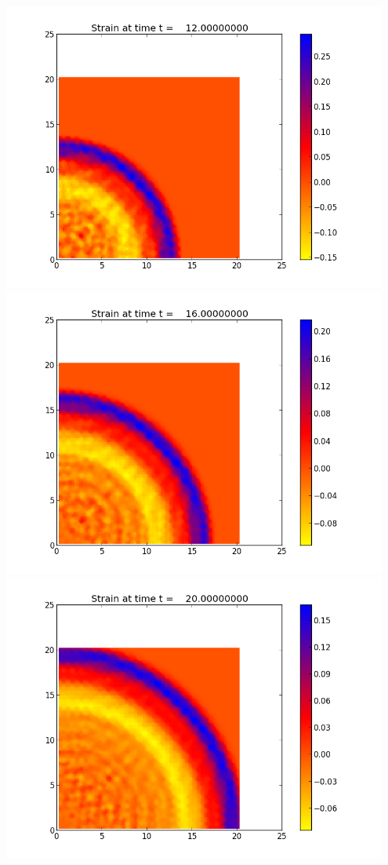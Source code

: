 \documentclass[11pt]{article}
\begin{document}
\vskip 10pt 
\includegraphics[width=0.95\textwidth]{frame0003fig0.png}
\vskip 10pt 
\includegraphics[width=0.95\textwidth]{frame0004fig0.png}
\vskip 10pt 
\includegraphics[width=0.95\textwidth]{frame0005fig0.png}
\end{document}
